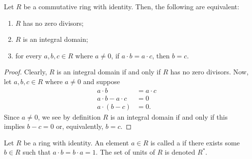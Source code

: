 \begin{prop}
Let $ R $ be a commutative ring with identity. Then, the following are equivalent:
\begin{enumerate}
    \item $ R $ has no zero divisors;
    \item $ R $ is an integral domain;
    \item for every $ a,b,c\in R $ where $ a\neq 0 $, if $ a\cdot b=a\cdot c $, then $ b=c $.
\end{enumerate}
\end{prop}
\begin{proof}

Clearly, $ R $ is an integral domain if and only if $ R $ has no zero divisors. Now, let $ a,b,c\in R $ where $ a\neq 0 $ and suppose
\begin{align*}
    a\cdot b &= a\cdot c \\
    a\cdot b-a\cdot c &= 0 \\
    a\cdot(b-c) &= 0.
\end{align*}
Since $ a\neq 0 $, we see by definition $ R $ is an integral domain if and only if this implies $ b-c=0 $ or, equivalently, $ b=c $.
\end{proof}

\begin{defn}
Let $ R $ be a ring with identity. An element $ a\in R $ is called a  if there exists some $ b\in R $ such that $ a\cdot b=b\cdot a=1 $. The set of units of $ R $ is denoted $ R^* $.
\end{defn}

